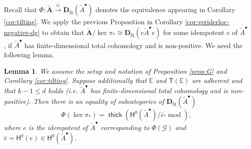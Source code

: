 \documentclass[a4paper,11pt, reqno]{amsart}
\def\E{\mathbb E}
\def\AA{\mathbf A}
\def\DD{\mathbf D}
\def\sG{\mathscr{G}}
\def\mod{{\operatorname{mod}}}
\newcommand{\opname}[1]{\operatorname{\mathsf{#1}}}
\newcommand{\thick}{\opname{thick}\nolimits}
\newcommand{\bH}{\mathsf{H}}
\newcommand{\bT}{\mathsf{T}}
\theoremstyle{plain}
\newtheorem{lemma}[dummy]{Lemma}
\theoremstyle{definition}
\numberwithin{equation}{section}
\newlength{\arrow}
\begin{document}
Recall that
$\Phi\colon \tilde{\AA} \xrightarrow{\cong} \DD_{\mathrm{fg}}(\tilde{A}^\bullet )$ denotes the equivalence appearing 
in Corollary \ref{cor:tilting}.
We apply the previous Proposition in Corollary \ref{cor:veriderloc-negative-dg} to obtain that $\tilde{\AA}/ \ker \pi_\ast \cong \DD_{\mathrm{fg}} ( e \tilde{A}^\bullet e)$ for some idempotent $e$ of $\tilde{A}^\bullet$, if $\tilde{A}^\bullet$ has finite-dimensional total cohomology and is non-positive.
We need the following lemma.



\begin{lemma}\label{L:SimplesGenKernel}
We assume the setup and notation of Proposition \ref{prop:G} and Corollary \ref{cor:tilting}.
Suppose  additionally that $\E$ and $\bT ( \E )$ are adherent and that $k-1\leq d$ holds (i.e. $\tilde{A}^\bullet$ has finite-dimensional total cohomology and is non-positive).
Then there is an  equality of subcategories of $\DD_{\mathrm{fg}} ( \tilde{A}^\bullet )$
\[
\Phi(\ker \pi_*) = \thick ( \bH^0( \tilde{A}^\bullet ) / \bar{e} \mbox{-} \mod   ),
\]
where $e$ is the idempotent of $\tilde{A}^\bullet$ corresponding to $\Phi ( \sG )$ and $\bar{e} = \bH^0 ( e ) \in \bH^0 ( \tilde{A}^\bullet )$.
\end{lemma}
\end{document}
